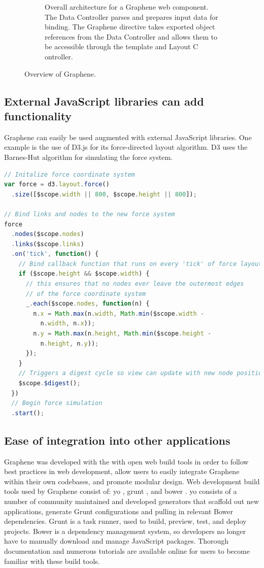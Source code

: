 \begin{figure}
\begin{subfigure}[b]{\textwidth}
    \caption{Overall architecture for a Graphene web component. The Data Controller parses and prepares input data for binding. 
      The Graphene directive takes exported object references from the Data Controller and allows them to be accessible through the template and Layout C      ontroller.}
    \label{Figure:graphene-diagram}
  \end{subfigure}
  \caption{Overview of Graphene.}
  \label{Figure:graphene}
\end{figure}

\subsection{External JavaScript libraries can add functionality}
Graphene can easily be used augmented with external JavaScript libraries.
One example is the use of D3.js \autocite{bostock2014d3} for its force-directed layout algorithm.
D3 uses the Barnes-Hut algorithm for simulating the force system. \autocite{bostock2011d3}

\begin{lstlisting}[language=JavaScript]
// Initalize force coordinate system
var force = d3.layout.force()
  .size([$scope.width || 800, $scope.height || 800]);

// Bind links and nodes to the new force system
force
  .nodes($scope.nodes)
  .links($scope.links)
  .on('tick', function() {
    // Bind callback function that runs on every 'tick' of force layout
    if ($scope.height && $scope.width) {
      // this ensures that no nodes ever leave the outermost edges
      // of the force coordinate system
      _.each($scope.nodes, function(n) {
        n.x = Math.max(n.width, Math.min($scope.width -
          n.width, n.x));
        n.y = Math.max(n.height, Math.min($scope.height -
          n.height, n.y));
      });
    }
    // Triggers a digest cycle so view can update with new node positions
    $scope.$digest();
  })
  // Begin force simulation
  .start();
\end{lstlisting}

\subsection{Ease of integration into other applications}

Graphene was developed with the with open web build tools in order to follow best practices in web development, allow users to easily integrate Graphene within their own codebases, and promote modular design.
Web development build tools used by Graphene consist of: yo \autocite{yeoman2014yo}, grunt \autocite{alman2014grunt}, and bower \autocite{twitter2014bower}.
yo consists of a number of community maintained and developed generators that scaffold out new applications, generate Grunt configurations and pulling in relevant Bower dependencies.
Grunt is a task runner, used to build, preview, test, and deploy projects.
Bower is a dependency management system, so developers no longer have to manually download and manage JavaScript packages.
Thorough documentation and numerous tutorials are available online for users to become familiar with these build tools.

